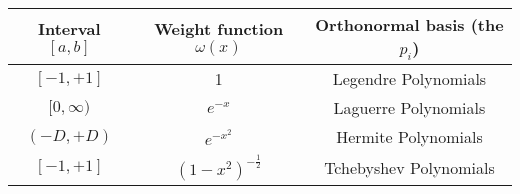 \begin{center}
  \begin{tabular}{|c|c|c|}
    \hline
    Interval $[a, b]$ & Weight function $\omega(x)$ & Orthonormal basis (the $p_i$) \\
    \hline\hline
    $[-1, +1]$ & 1 & Legendre Polynomials \\
    \hline
    $[0, \infty)$ & $e^{-x}$ & Laguerre Polynomials \\
    \hline
    $(-D, +D)$ & $e^{-x^2}$ & Hermite Polynomials \\
    \hline
    $[-1, +1]$ & $(1-x^2)^{-\frac 12}$ & Tchebyshev Polynomials \\
    \hline    
\end{tabular}
\end{center}

